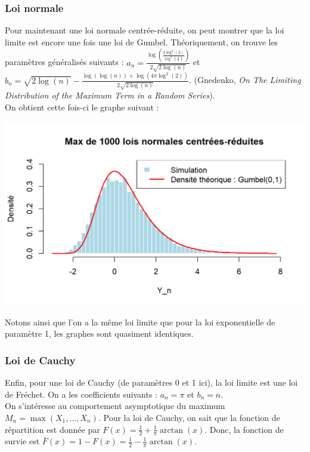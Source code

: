 \documentclass{article}
\theoremstyle{plain}
\theoremstyle{definition}
\theoremstyle{plain}
\begin{document}
\subsubsection{Loi normale}

\noindent Pour maintenant une loi normale centrée-réduite, on peut montrer que la loi limite est encore une fois une loi de Gumbel. Théoriquement, on trouve les paramètres généralisés suivants : $a_n = \frac{\log\left(\frac{4\log^2(2)}{\log^2\left(\frac{4}{3}\right)}\right)}{2\sqrt{2\log(n)}} $ et $b_n = \sqrt{2\log(n)} - \frac{\log(\log(n)) + \log\left(4\pi \log^2(2)\right)}{2\sqrt{2\log(n)}} $. (Gnedenko, \textit{On The Limiting Distribution of the Maximum Term in a Random Series}). \\
\noindent On obtient cette fois-ci le graphe suivant :

\begin{center}
	\includegraphics[scale=0.8]{./images/Max_Normale.png} 
\end{center}

\noindent Notons ainsi que l'on a la même loi limite que pour la loi exponentielle de paramètre 1, les graphes sont quasiment identiques.

\subsubsection{Loi de Cauchy}

\noindent Enfin, pour une loi de Cauchy (de paramètres 0 et 1 ici), la loi limite est une loi de Fréchet. On a les coefficients suivants : $a_n = \pi $ et $b_n = n $. \\

\noindent On s'intéresse au comportement asymptotique du maximum $ M_n = \max(X_1, \dots, X_n) $. Pour la loi de Cauchy, on sait que la fonction de répartition est donnée par $ F(x) = \frac{1}{2} + \frac{1}{\pi} \arctan(x) $. Donc, la fonction de survie est $ \bar{F}(x) = 1 - F(x) = \frac{1}{2} - \frac{1}{\pi} \arctan(x) $. \\
\end{document}
